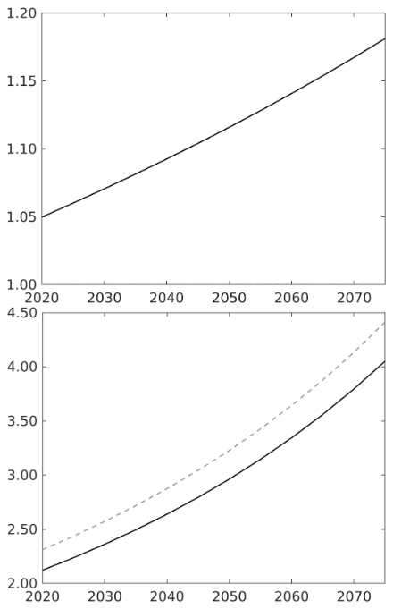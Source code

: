 \documentclass[12pt]{article}
\begin{document}
\begin{figure}[h!!]
\begin{minipage}[]{0.32\textwidth}
	\end{minipage}	
	\begin{minipage}[]{0.32\textwidth}
		\includegraphics[width=1\textwidth]{../../codding_model/own_basedOnFried/optimalPol_010922_revision/figures/all_13Sept22/CompTaul_LFBAU_Reg0_lambdaa_spillover0_nsk1_xgr1_knspil0_sep1_countec0_GovRev0_etaa0.79_lgd0.png}
	\end{minipage}	
	\begin{minipage}[]{0.32\textwidth}
		\includegraphics[width=1\textwidth]{../../codding_model/own_basedOnFried/optimalPol_010922_revision/figures/all_13Sept22/CompTaul_LFBAU_Reg0_Y_spillover0_nsk1_xgr1_knspil0_sep1_countec0_GovRev0_etaa0.79_lgd0.png}

\end{minipage}
\end{figure}
\end{document}
